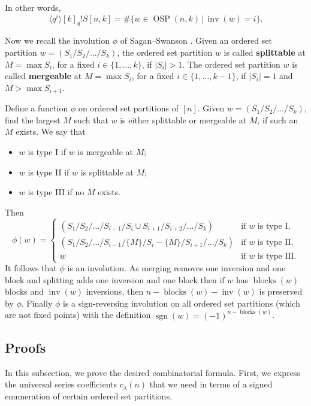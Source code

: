 \documentclass[11pt]{amsart}
\theoremstyle{definition}
\newcommand{\0}{\emptyset}
\DeclareMathOperator{\OSP}{OSP}
\DeclareMathOperator{\inv}{inv}
\DeclareMathOperator{\sgn}{sgn}
\DeclareMathOperator{\blocks}{blocks}
\begin{document}
In other words,
\begin{equation}\label{eq:OSP-equation}
    \langle q^i \rangle [k]_q! S[n,k] = \#\{w \in \OSP(n,k)\, | \, \inv(w) = i \}.
\end{equation}



Now we recall the involution $\phi$ of Sagan--Swanson \cite[Section 5.1]{SaganSwanson2024}.
Given an ordered set partition $w=(S_1/S_2/\ldots /S_k)$, the ordered set partition $w$ is called \textbf{splittable} at $M = \max S_i$, for a fixed $i \in\{1,\ldots,k\}$, if $|S_i|>1$. 
The ordered set partition $w$ is called \textbf{mergeable} at $M= \max S_i$, for a fixed $i \in\{1,\ldots,k-1\}$, if $|S_i|=1$ and $M>\max S_{i+1}$.

Define a function $\phi$ on ordered set partitions of $[n]$.
Given $w=(S_1/S_2/\ldots /S_k)$, find the largest $M$ such that $w$ is either splittable or mergeable at $M$, if such an $M$ exists. We say that
\begin{itemize}
    \item $w$ is type I if $w$ is mergeable at $M$;
    \item $w$ is type II if $w$ is splittable at $M$;
    \item $w$ is type III if no $M$ exists.
\end{itemize}
Then 
\begin{equation}\label{eq:phi-mergeable-splittable}
\phi(w)=\begin{cases}
   (S_1/S_2/\ldots /S_{i-1}/S_i\cup S_{i+1}/S_{i+2}/\ldots  /S_k) & \text{if $w$ is type I}, \\
   (S_1/S_2/\ldots /S_{i-1}/\{M\}/S_i-\{M\}/S_{i+1}/\ldots  /S_k) & \text{if $w$ is type II}, \\
   w & \text{if $w$ is type III}.
\end{cases}
\end{equation}
It follows that $\phi$ is an involution.
As merging removes one inversion and one block
and splitting adds one inversion and one block then if $w$ has $\blocks(w)$ blocks and $\inv(w)$ inversions, then $n-\blocks(w)-\inv(w)$ is preserved by $\phi$.
Finally $\phi$ is a sign-reversing involution on all ordered set partitions (which are not fixed points) with the definition $\sgn(w) = (-1)^{n- \blocks(w)}$.

\subsection{Proofs}
In this subsection, we prove the desired combinatorial formula. First, we express the universal series coefficients $c_{\lambda}(n)$ that we need in terms of a signed enumeration of certain ordered set partitions.
\end{document}

